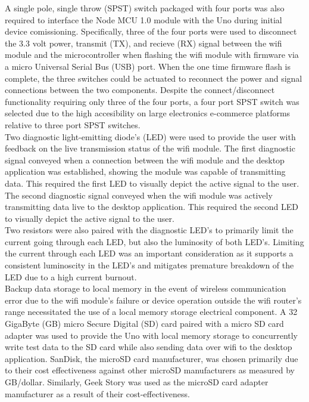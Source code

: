 \documentclass[12pt, titlepage]{article}
\begin{document}
A single pole, single throw (SPST) switch packaged with four ports was also required to interface the Node MCU 1.0 module with the Uno during initial device comissioning. Specifically, three of the four ports were used to disconnect the 3.3 volt power, transmit (TX), and recieve (RX) signal between the wifi module and the microcontroller when flashing the wifi module with firmware via a micro Universal Serial Bus (USB) port. When the one time firmware flash is complete, the three switches could be actuated to reconnect the power and signal connections between the two components. Despite the connect/disconnect functionality requiring only three of the four ports, a four port SPST switch was selected due to the high accesibility on large electronics e-commerce platforms relative to three port SPST switches. \\

Two diagnostic light-emitting diode's (LED) were used to provide the user with feedback on the live transmission status of the wifi module. The first diagnostic signal conveyed when a connection between the wifi module and the desktop application was established, showing the module was capable of transmitting data. This required the first LED to visually depict the active signal to the user. The second diagnostic signal conveyed when the wifi module was actively transmitting data live to the desktop application. This required the second LED to visually depict the active signal to the user. \\

Two resistors were also paired with the diagnostic LED's to primarily limit the current going through each LED, but also the luminosity of both LED's. Limiting the current through each LED was an important consideration as it supports a consistent luminoscity in the LED's and mitigates premature breakdown of the LED due to a high current burnout. \\

Backup data storage to local memory in the event of wireless communication error due to the wifi module's failure or device operation outside the wifi router's range necessitated the use of a local memory storage electrical component. A 32 GigaByte (GB) micro Secure Digital (SD) card paired with a micro SD card adapter was used to provide the Uno with local memory storage to concurrently write test data to the SD card while also sending data over wifi to the desktop application. SanDisk, the microSD card manufacturer, was chosen primarily due to their cost effectiveness against other microSD manufacturers as measured by GB/dollar. Similarly, Geek Story was used as the microSD card adapter manufacturer as a result of their cost-effectiveness. \\
\end{document}
